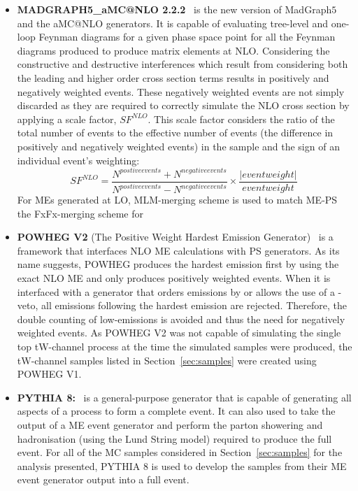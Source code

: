 \begin{itemize}
\item \textbf{MADGRAPH5\_aMC@NLO 2.2.2}~\cite{Alwall:2014hca} is the new version of MadGraph$5$ and the aMC@NLO generators.
It is capable of evaluating tree-level and one-loop Feynman diagrams for a given phase space point for all the Feynman diagrams produced to produce matrix elements at NLO.
Considering the constructive and destructive interferences which result from considering both the leading and higher order cross section terms results in positively and negatively weighted events.
These negatively weighted events are not simply discarded as they are required to correctly simulate the NLO cross section by applying a scale factor, $SF^{NLO}$.
This scale factor considers the ratio of the total number of events to the effective number of events (\ie the difference in positively and negatively weighted events) in the sample and the sign of an individual event's weighting:
\begin{equation}
SF^{NLO} = \frac{N^{postive events} + N^{negative events}}{N^{postive events} - N^{negative events}} \times \frac{|event weight|}{event weight} \;
\end{equation}
For MEs generated at LO, MLM-merging scheme is used to match ME-PS the FxFx-merging scheme for 

\item \textbf{POWHEG V2} (The Positive Weight Hardest Emission Generator)~\cite{Alioli:2010xd} is a framework that interfaces NLO ME calculations with PS generators.
As its name suggests, POWHEG produces the hardest emission first by using the exact NLO ME and only produces positively weighted events.
When it is interfaced with a generator that orders emissions by \pT or allows the use of a \pT-veto, all emissions following the hardest emission are rejected.
Therefore, the double counting of low-\pT emissions is avoided and thus the need for negatively weighted events.
As POWHEG V2 was not capable of simulating the single top tW-channel process at the time the simulated samples were produced, the tW-channel samples listed in Section~\ref{sec:samples} were created using POWHEG V1.

%


\item \textbf{PYTHIA 8:}~\cite{Sjostrand:2014zea} is a general-purpose generator that is capable of generating all aspects of a process to form a complete event.
It can also used to take the output of a ME event generator and perform the parton showering and hadronisation (using the Lund String model) required to produce the full event. For all of the MC samples considered in Section~\ref{sec:samples} for the analysis presented, PYTHIA 8 is used to develop the samples from their ME event generator output into a full event. 
\end{itemize}

